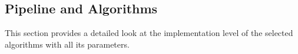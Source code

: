 \subsection{Pipeline and Algorithms}\label{subsec:pipeline}

This section provides a detailed look at the implementation level of the selected algorithms
with all its parameters.



